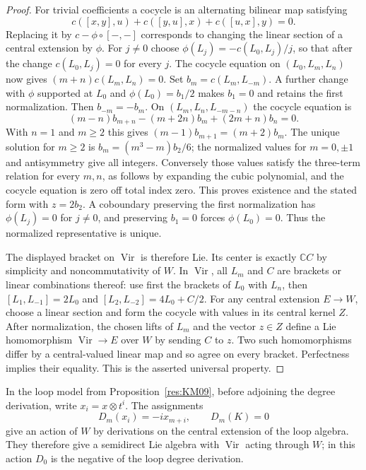\begin{proof}
For trivial coefficients a cocycle is an alternating bilinear map
satisfying
\[
 c([x,y],u)+c([y,u],x)+c([u,x],y)=0 .
\]
Replacing it by \(c-\phi\circ[-,-]\) corresponds to changing
the linear section of a central extension by \(\phi\).
For \(j\ne0\) choose
\(\phi(L_j)=-c(L_0,L_j)/j\), so that after the change
\(c(L_0,L_j)=0\) for every \(j\). The cocycle equation on
\((L_0,L_m,L_n)\) now gives
\((m+n)c(L_m,L_n)=0\). Set \(b_m=c(L_m,L_{-m})\).
A further change with \(\phi\) supported at \(L_0\) and
\(\phi(L_0)=b_1/2\) makes \(b_1=0\) and retains the first
normalization. Then \(b_{-m}=-b_m\). On
\((L_m,L_n,L_{-m-n})\) the cocycle equation is
\[
 (m-n)b_{m+n}-(m+2n)b_m+(2m+n)b_n=0 .
\]
With \(n=1\) and \(m\ge2\) this gives
\((m-1)b_{m+1}=(m+2)b_m\). The unique solution for \(m\ge2\)
is \(b_m=(m^3-m)b_2/6\); the normalized values for
\(m=0,\pm1\) and antisymmetry give all integers. Conversely
those values satisfy the three-term relation for every \(m,n\),
as follows by expanding the cubic polynomial, and the cocycle
equation is zero off total index zero. This proves existence
and the stated form with \(z=2b_2\). A coboundary preserving
the first normalization has \(\phi(L_j)=0\) for \(j\ne0\),
and preserving \(b_1=0\) forces \(\phi(L_0)=0\).
Thus the normalized representative is unique.

The displayed bracket on \(\operatorname{Vir}\) is therefore
Lie. Its center is exactly \(\mathbb C C\) by simplicity and
noncommutativity of \(W\). In \(\operatorname{Vir}\), all
\(L_m\) and \(C\) are brackets or linear combinations thereof:
use first the brackets of \(L_0\) with \(L_n\), then
\([L_1,L_{-1}]=2L_0\) and
\([L_2,L_{-2}]=4L_0+C/2\). For any central extension
\(E\to W\), choose a linear section and form the cocycle with
values in its central kernel \(Z\).
After normalization, the chosen lifts of \(L_m\) and the vector
\(z\in Z\) define a Lie homomorphism
\(\operatorname{Vir}\to E\) over \(W\) by sending \(C\) to \(z\).
Two such homomorphisms differ by a central-valued linear map
and so agree on every bracket. Perfectness implies their equality.
This is the asserted universal property.
\end{proof}

\begin{proposition}
\label{res:KM12}
In the loop model from Proposition~\ref{res:KM09}, before adjoining
the degree derivation, write \(x_i=x\otimes t^i\).
The assignments
\[
 D_m(x_i)=-i x_{m+i},\qquad D_m(K)=0
\]
give an action of \(W\) by derivations on the central extension
of the loop algebra. They therefore give a semidirect Lie algebra
with \(\operatorname{Vir}\) acting through \(W\); in this action
\(D_0\) is the negative of the loop degree derivation.
\end{proposition}

